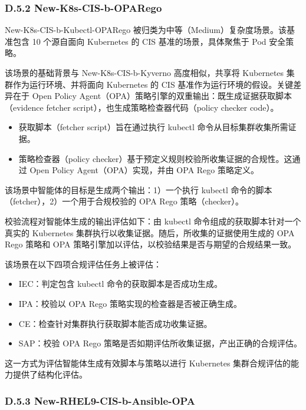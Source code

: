 \subsubsection{D.5.2 New-K8s-CIS-b-OPARego}

New-K8s-CIS-b-Kubectl-OPARego 被归类为中等（Medium）复杂度场景。该基准包含 10 个源自面向 Kubernetes 的 CIS 基准的场景，具体聚焦于 Pod 安全策略。

该场景的基础背景与 New-K8s-CIS-b-Kyverno 高度相似，共享将 Kubernetes 集群作为运行环境、并将面向 Kubernetes 的 CIS 基准作为运行环境的假设。关键差异在于 Open Policy Agent（OPA）策略引擎的双重输出：既生成证据获取脚本（evidence fetcher script），也生成策略检查器代码（policy checker code）。

\begin{itemize}
\item 获取脚本（fetcher script）旨在通过执行 kubectl 命令从目标集群收集所需证据。
\item 策略检查器（policy checker）基于预定义规则校验所收集证据的合规性。这通过 Open Policy Agent（OPA）实现，并由 OPA Rego 策略定义。
\end{itemize}

该场景中智能体的目标是生成两个输出：1）一个执行 kubectl 命令的脚本（fetcher），2）一个用于合规校验的 OPA Rego 策略（checker）。

校验流程对智能体生成的输出评估如下：由 kubectl 命令组成的获取脚本针对一个真实的 Kubernetes 集群执行以收集证据。随后，所收集的证据使用生成的 OPA Rego 策略和 OPA 策略引擎加以评估，以校验结果是否与期望的合规结果一致。

该场景在以下四项合规评估任务上被评估：

\begin{itemize}
\item IEC：判定包含 kubectl 命令的获取脚本是否成功生成。
\item IPA：校验以 OPA Rego 策略实现的检查器是否被正确生成。
\item CE：检查针对集群执行获取脚本能否成功收集证据。
\item SAP：校验 OPA Rego 策略是否如期评估所收集证据，产出正确的合规评估。
\end{itemize}

这一方式为评估智能体生成有效脚本与策略以进行 Kubernetes 集群合规评估的能力提供了结构化评估。

\subsubsection{D.5.3 New-RHEL9-CIS-b-Ansible-OPA}


